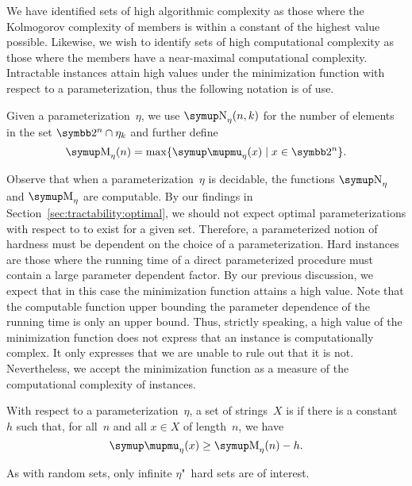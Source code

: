 We have identified sets of high algorithmic complexity as those where the Kolmogorov complexity of members is within a constant of the highest value possible.
Likewise, we wish to identify sets of high computational complexity as those where the members have a near-maximal computational complexity.
Intractable instances attain high values under the minimization function with respect to a parameterization, thus the following notation is of use.
\begin{definition}
  Given a parameterization~$\eta$, we use $\upN_\eta(n, k)$ for the number of elements in the set $\binary^n \cap \eta_k$ and further define
  \begin{equation*}
    \upM_\eta(n) \deq \max\{\mu_\eta(x) \st x \in \binary^n\}.
  \end{equation*}
\end{definition}

Observe that when a parameterization~$\eta$ is decidable, the functions $\upN_\eta$ and $\upM_\eta$ are computable.
By our findings in Section~\ref{sec:tractability:optimal}, we should not expect optimal parameterizations with respect to  to exist for a given set.
Therefore, a parameterized notion of hardness must be dependent on the choice of a parameterization.
Hard instances are those where the running time of a direct parameterized procedure must contain a large parameter dependent factor.
By our previous discussion, we expect that in this case the minimization function attains a high value.
Note that the computable function upper bounding the parameter dependence of the running time is only an upper bound.
Thus, strictly speaking, a high value of the minimization function does not express that an instance is computationally complex.
It only expresses that we are unable to rule out that it is not.
Nevertheless, we accept the minimization function as a measure of the computational complexity of instances.
\begin{definition}
\label{def:hard}%
  With respect to a parameterization~$\eta$, a set of strings~$X$ is  if there is a constant~$h$ such that, for all~$n$ and all $x \in X$ of length~$n$, we have
  \begin{equation*}
    \mu_\eta(x) \ge \upM_\eta(n) - h.
  \end{equation*}
\end{definition}
As with random sets, only infinite $\eta$"~hard sets are of interest.

